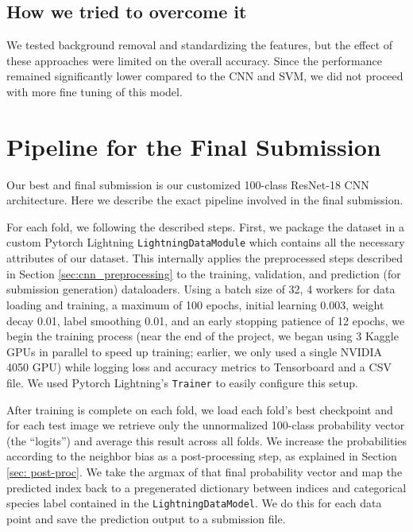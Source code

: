 \documentclass[10pt]{article} %
\begin{document}
\subsection{How we tried to overcome it}
We tested background removal and standardizing the features, but the effect of these approaches were limited on the overall accuracy. Since the performance remained significantly lower compared to the CNN and SVM, we did not proceed with more fine tuning of this model.

\section{Pipeline for the Final Submission}
Our best and final submission is our customized 100-class ResNet-18 CNN architecture. Here we describe the exact pipeline involved in the final submission. 

For each fold, we following the described steps. First, we package the dataset in a custom Pytorch Lightning \texttt{LightningDataModule} which contains all the necessary attributes of our dataset. This internally applies the preprocessed steps described in Section \ref{sec:cnn_preprocessing} to the training, validation, and prediction (for submission generation) dataloaders. Using a batch size of 32, 4 workers for data loading and training, a maximum of 100 epochs, initial learning 0.003, weight decay 0.01, label smoothing 0.01, and an early stopping patience of 12 epochs, we begin the training process (near the end of the project, we began using 3 Kaggle GPUs in parallel to speed up training; earlier, we only used a single NVIDIA 4050 GPU) while logging loss and accuracy metrics to Tensorboard and a CSV file. We used Pytorch Lightning's \texttt{Trainer} to easily configure this setup.

After training is complete on each fold, we load each fold's best checkpoint and for each test image we retrieve only the unnormalized 100-class probability vector (the ``logits'') and average this result across all folds. We increase the probabilities according to the neighbor bias as a post-processing step, as explained in Section \ref{sec: post-proc}. We take the argmax of that final probability vector and map the predicted index back to a pregenerated dictionary between indices and categorical species label contained in the \texttt{LightningDataModel}. We do this for each data point and save the prediction output to a submission file.
\end{document}
